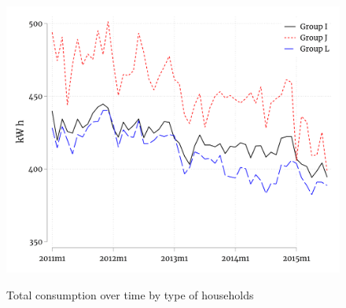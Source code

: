 \begin{figure}[ht]
  \caption{Total consumption over time by type of households}\label{fig:sixteen}
  \begin{center}
  {\includegraphics[width=1\textwidth]{./figures/totalTypeContract.png}}
  \end{center}
\end{figure}

\FloatBarrier
